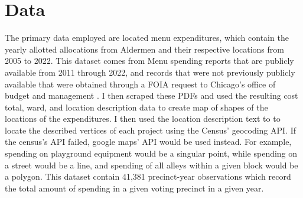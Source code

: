 \section*{Data}
The primary data employed are located menu expenditures, which contain the yearly allotted allocations from Aldermen and their respective locations from 2005 to 2022.
This dataset comes from Menu spending reports that are publicly available from 2011 through 2022, and records that were not previously publicly available that were obtained through a FOIA request to Chicago's office of budget and management \cite{OBM_datasource}.  
I then scraped these PDFs and used the resulting cost total, ward, and location description data to create map of shapes of the locations of the expenditures.
I then used the location description text to to locate the described vertices of each project using the Census' geocoding API. 
If the census's API failed, google maps' API would be used instead.
For example, spending on playground equipment would be a singular point, while spending on a street would be a line, and spending of all alleys within a given block would be a polygon.
This dataset contain 41,381 precinct-year observations which record the total amount of spending in a given voting precinct in a given year.